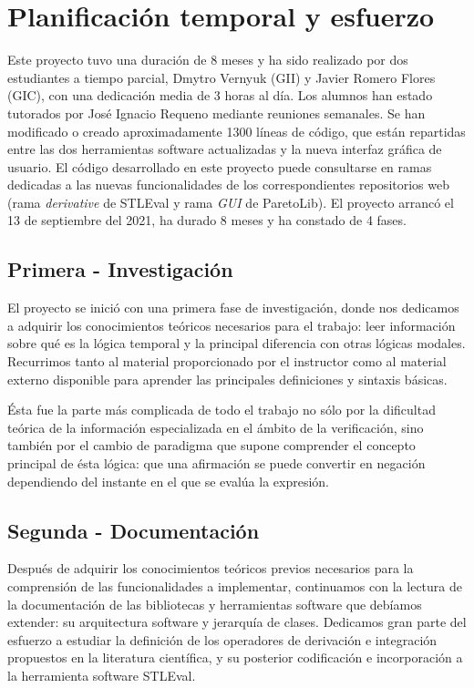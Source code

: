 \section{Planificación temporal y esfuerzo}

Este proyecto tuvo una duración de 8 meses y ha sido realizado por dos estudiantes a tiempo parcial, Dmytro Vernyuk (GII) y Javier Romero Flores (GIC), con una dedicación media de 3 horas al día. Los alumnos han estado tutorados por José Ignacio Requeno mediante reuniones semanales. Se han modificado o creado aproximadamente 1300 líneas de código, que están repartidas entre las dos herramientas software actualizadas y la nueva interfaz gráfica de usuario. El código desarrollado en este proyecto puede consultarse en ramas dedicadas a las nuevas funcionalidades de los correspondientes repositorios web (rama \textit{derivative} de STLEval y rama \textit{GUI} de ParetoLib). El proyecto arrancó el 13 de septiembre del 2021, ha durado 8 meses y ha constado de 4 fases.

\subsection{Primera - Investigación}
El proyecto se inició con una primera fase de investigación, donde nos dedicamos a adquirir los conocimientos teóricos necesarios para el trabajo: leer información sobre qué es la lógica temporal y la principal diferencia con otras lógicas modales. Recurrimos tanto al material proporcionado por el instructor como al material externo disponible para aprender las principales definiciones y sintaxis básicas. 

Ésta fue la parte más complicada de todo el trabajo no sólo por la dificultad teórica de la información especializada en el ámbito de la verificación, sino también por el cambio de paradigma que supone comprender el concepto principal de ésta lógica: que una afirmación se puede convertir en negación dependiendo del instante en el que se evalúa la expresión.
	
\subsection{Segunda - Documentación}

	Después de adquirir los conocimientos teóricos previos necesarios para la comprensión de las funcionalidades a implementar, continuamos con la lectura de la documentación de las bibliotecas y herramientas software que debíamos extender: su arquitectura software y jerarquía de clases. Dedicamos gran parte del esfuerzo a estudiar la definición de los operadores de derivación e integración propuestos en la literatura científica, y su posterior codificación e incorporación a la herramienta software STLEval.
	
